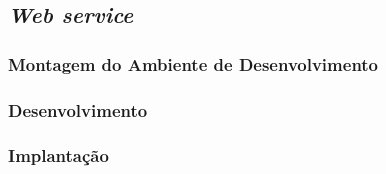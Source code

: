 			\subsection{\textit{Web service}}	
				
	
						\subsubsection{Montagem do Ambiente de Desenvolvimento}
							
	
						\subsubsection{Desenvolvimento}
							
						\subsubsection{Implantação}	
							